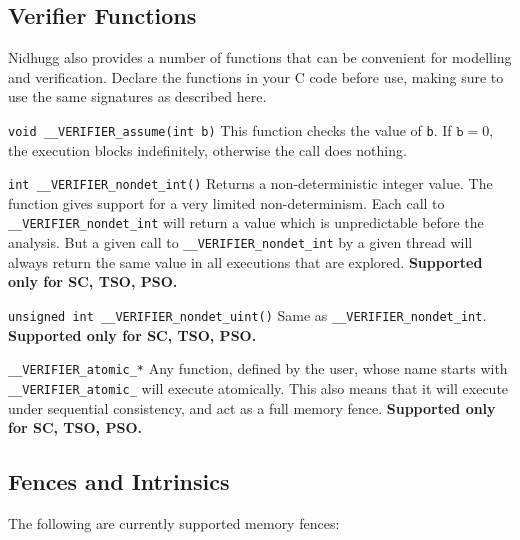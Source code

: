 \documentclass[a4paper]{article}
\newcommand{\limitsupport}[1]{\textbf{Supported only for #1.}}
\begin{document}
\subsection{Verifier Functions}

Nidhugg also provides a number of functions that can be convenient for
modelling and verification. Declare the functions in your C code
before use, making sure to use the same signatures as described here.

\begin{description}
\item{\texttt{void \_\_VERIFIER\_assume(int b)}}
%
  This function checks the value of \texttt{b}. If $\texttt{b} = 0$,
  the execution blocks indefinitely, otherwise the call does nothing.
\item{\texttt{int \_\_VERIFIER\_nondet\_int()}}
%
  Returns a non-deterministic integer value. The function gives
  support for a very limited non-determinism. Each call to
  \texttt{\_\_VERIFIER\_nondet\_int} will return a value which is
  unpredictable before the analysis. But a given call to
  \texttt{\_\_VERIFIER\_nondet\_int} by a given thread will always
  return the same value in all executions that are explored.
%
  \limitsupport{SC, TSO, PSO}
\item{\texttt{unsigned int \_\_VERIFIER\_nondet\_uint()}}
%
  Same as \texttt{\_\_VERIFIER\_nondet\_int}.
%
  \limitsupport{SC, TSO, PSO}
\item{\texttt{\_\_VERIFIER\_atomic\_*}}
%
  Any function, defined by the user, whose name starts with
  \texttt{\_\_VERIFIER\_atomic\_} will execute atomically. This also
  means that it will execute under sequential consistency, and act as
  a full memory fence.
%
  \limitsupport{SC, TSO, PSO}
\end{description}

\subsection{Fences and Intrinsics}

The following are currently supported memory fences:
\end{document}
